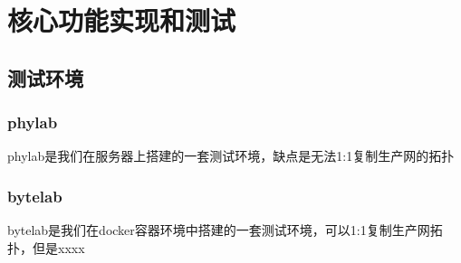 
\chapter{核心功能实现和测试}

\section{测试环境}
\subsection{phylab}
phylab是我们在服务器上搭建的一套测试环境，缺点是无法1:1复制生产网的拓扑
\subsection{bytelab}
bytelab是我们在docker容器环境中搭建的一套测试环境，可以1:1复制生产网拓扑，但是xxxx